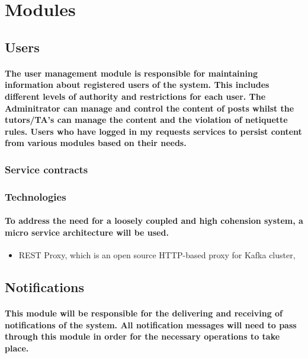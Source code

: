 \documentclass[12pt]{article}
\begin{document}
\newpage
\section{Modules}

\subsection{Users}
\paragraph{The user management module is responsible for maintaining information about registered users of the system. This includes different levels of authority and restrictions for each user. The Adminitrator can manage and control the content of posts whilst the tutors/TA's can manage the content and the violation of netiquette rules. Users who have logged in my requests services to persist content from various modules based on their needs.}

\subsubsection{Service contracts}

\subsubsection{Technologies}
\paragraph{ To address the need for a loosely coupled and high cohension system, a micro service architecture will be used. }

\begin{itemize} 
\item  REST Proxy, which is an open source HTTP-based proxy for Kafka cluster, 
\end{itemize}



\subsection{Notifications}
\paragraph{This module will be responsible for the delivering and receiving of notifications of the system. All notification messages will need to pass through this module in order for the necessary operations to take place.}
\end{document}
